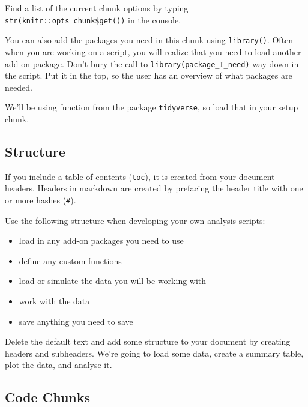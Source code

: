 \documentclass[
  oneside]{book}
\providecommand{\tightlist}{%
  \setlength{\itemsep}{0pt}\setlength{\parskip}{0pt}}
\begin{document}
Find a list of the current chunk options by typing \texttt{str(knitr::opts\_chunk\$get())} in the console.

You can also add the packages you need in this chunk using \texttt{library()}. Often when you are working on a script, you will realize that you need to load another add-on package. Don't bury the call to \texttt{library(package\_I\_need)} way down in the script. Put it in the top, so the user has an overview of what packages are needed.

\begin{try}
We'll be using function from the package \texttt{tidyverse}, so load that in your setup chunk.

\end{try}

\hypertarget{structure}{%
\subsection{Structure}\label{structure}}

If you include a table of contents (\texttt{toc}), it is created from your document headers. Headers in markdown are created by prefacing the header title with one or more hashes (\texttt{\#}).

Use the following structure when developing your own analysis scripts:

\begin{itemize}
\tightlist
\item
  load in any add-on packages you need to use
\item
  define any custom functions
\item
  load or simulate the data you will be working with
\item
  work with the data
\item
  save anything you need to save
\end{itemize}

\begin{try}
Delete the default text and add some structure to your document by creating headers and subheaders. We're going to load some data, create a summary table, plot the data, and analyse it.

\end{try}

\hypertarget{code-chunks}{%
\subsection{Code Chunks}\label{code-chunks}}
\end{document}
